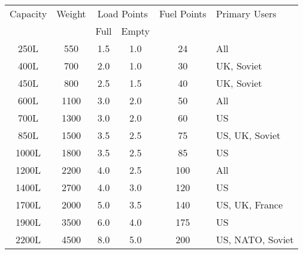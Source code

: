 \begin{twocolumntablefloat}
\begin{twocolumntable}
{
\begin{tabular}{cccccl}
\toprule
Capacity&
Weight&
\multicolumn{2}{c}{Load Points}&
Fuel Points&
Primary Users\\
\cmidrule{3-4}
&&Full&Empty&&\\
\midrule
\phantom{0}250L&\phantom{0}550&1.5&1.0&\phantom{0}24&All\\
\phantom{0}400L&\phantom{0}700&2.0&1.0&\phantom{0}30&UK, Soviet\\
\phantom{0}450L&\phantom{0}800&2.5&1.5&\phantom{0}40&UK, Soviet\\
\phantom{0}600L&\phantom{}1100&3.0&2.0&\phantom{0}50&All\\
\phantom{0}700L&\phantom{}1300&3.0&2.0&\phantom{0}60&US\\
\phantom{0}850L&\phantom{}1500&3.5&2.5&\phantom{0}75&US, UK, Soviet\\
\phantom{}1000L&\phantom{}1800&3.5&2.5&\phantom{0}85&US\\
\phantom{}1200L&\phantom{}2200&4.0&2.5&\phantom{}100&All\\
\phantom{}1400L&\phantom{}2700&4.0&3.0&\phantom{}120&US\\
\phantom{}1700L&\phantom{}2000&5.0&3.5&\phantom{}140&US, UK, France\\
\phantom{}1900L&\phantom{}3500&6.0&4.0&\phantom{}175&US\\
\phantom{}2200L&\phantom{}4500&8.0&5.0&\phantom{}200&US, NATO, Soviet\\
\bottomrule
\end{tabular}

}
\end{twocolumntable}
\end{twocolumntablefloat}